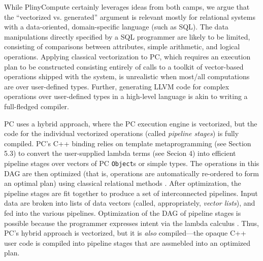While PlinyCompute certainly leverages ideas from both camps, we argue that the ``vectorized vs. generated'' argument is relevant mostly for 
relational systems with a data-oriented, domain-specific language (such as SQL).  
The data manipulations directly specified by a SQL programmer are likely to be limited, 
consisting of comparisons between attributes, simple arithmetic, and logical operations.
Applying classical vectorization to PC,
which requires an execution plan to be constructed consisting entirely of calls to a toolkit of
vector-based operations shipped with the system, is
unrealistic when most/all computations are over user-defined types.  
Further, generating LLVM code for complex operations over user-defined types 
in a high-level language 
is akin to writing a full-fledged compiler. 

PC uses a hybrid approach, where the PC execution engine is vectorized, but the code for the individual vectorized operations (called \emph{pipeline stages})
is fully compiled.  PC's C++ binding relies on template metaprogramming (see Section 5.3)
to convert the user-supplied lambda terms 
(see Secion 4) into efficient pipeline stages over vectors of PC \texttt{Object}s or simple types.
The operations in this DAG are then
optimized (that is, operations are automatically
re-ordered to form an optimal plan) using classical relational
methods \cite{chaudhuri1998overview, graefe1995cascades, jarke1984query}. After optimization, the pipeline stages are fit together to produce a set of interconnected pipelines.  Input data are broken into lists of 
data vectors (called, appropriately, \emph{vector lists}), and fed into the various pipelines.
Optimization of the DAG of pipeline stages
is possible because the programmer expresses intent via the lambda calculus \cite{barendregt1984lambda, moggi1989computational}.
Thus, PC's hybrid approach is vectorized, 
but it is \emph{also} compiled---the opaque C++ user code is compiled into pipeline stages that are 
assmebled into an optimized plan.


